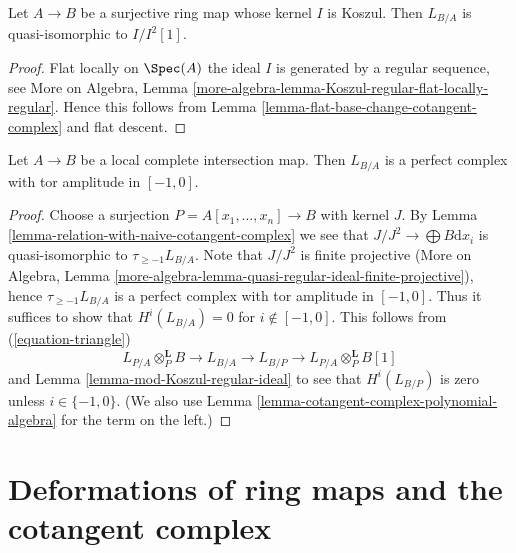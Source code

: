 \begin{lemma}
\label{lemma-mod-Koszul-regular-ideal}
Let $A \to B$ be a surjective ring map whose kernel $I$ is Koszul.
Then $L_{B/A}$ is quasi-isomorphic to $I/I^2[1]$.
\end{lemma}

\begin{proof}
Flat locally on $\Spec(A)$ the ideal $I$ is generated by a regular
sequence, see More on Algebra, Lemma
\ref{more-algebra-lemma-Koszul-regular-flat-locally-regular}.
Hence this follows from
Lemma \ref{lemma-flat-base-change-cotangent-complex}
and flat descent.
\end{proof}

\begin{proposition}
\label{proposition-cotangent-complex-local-complete-intersection}
Let $A \to B$ be a local complete intersection map.
Then $L_{B/A}$ is a perfect complex with tor amplitude in $[-1, 0]$.
\end{proposition}

\begin{proof}
Choose a surjection $P = A[x_1, \ldots, x_n] \to B$ with kernel $J$.
By Lemma \ref{lemma-relation-with-naive-cotangent-complex}
we see that $J/J^2 \to \bigoplus B\text{d}x_i$
is quasi-isomorphic to $\tau_{\geq -1}L_{B/A}$.
Note that $J/J^2$ is finite projective
(More on Algebra, Lemma
\ref{more-algebra-lemma-quasi-regular-ideal-finite-projective}),
hence $\tau_{\geq -1}L_{B/A}$ is a perfect complex with
tor amplitude in $[-1, 0]$.
Thus it suffices to show that $H^i(L_{B/A}) = 0$ for $i \not \in [-1, 0]$.
This follows from (\ref{equation-triangle})
$$
L_{P/A} \otimes_P^\mathbf{L} B \to L_{B/A} \to L_{B/P} \to
L_{P/A} \otimes_P^\mathbf{L} B[1]
$$
and Lemma \ref{lemma-mod-Koszul-regular-ideal}
to see that $H^i(L_{B/P})$ is zero unless $i \in \{-1, 0\}$.
(We also use Lemma \ref{lemma-cotangent-complex-polynomial-algebra}
for the term on the left.)
\end{proof}







\section{Deformations of ring maps and the cotangent complex}
\label{section-deformations}


